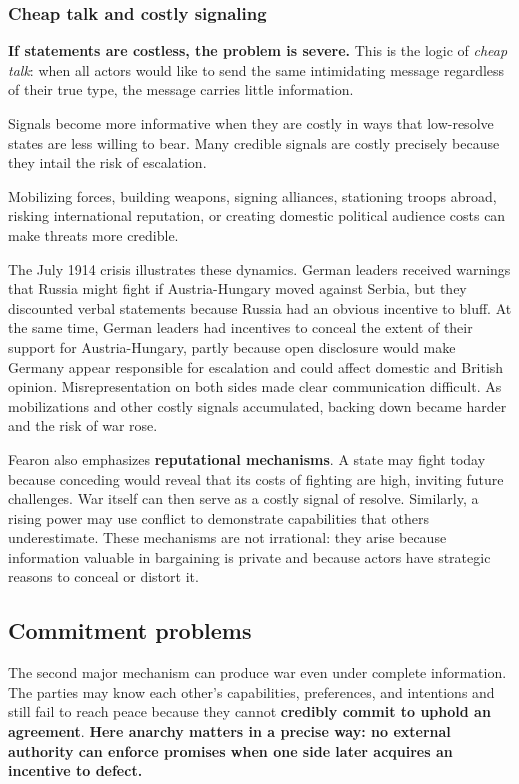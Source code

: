 \subsubsection{Cheap talk and costly signaling}

\textbf{If statements are costless, the problem is severe.} This is the logic of \textit{cheap talk}: when all actors would like to send the same intimidating message regardless of their true type, the message carries little information.

Signals become more informative when they are costly in ways that low-resolve states are less willing to bear. Many credible signals are costly precisely because they intail the risk of escalation.

Mobilizing forces, building weapons, signing alliances, stationing troops abroad, risking international reputation, or creating domestic political audience costs can make threats more credible. 

The July 1914 crisis illustrates these dynamics. German leaders received warnings that Russia might fight if Austria-Hungary moved against Serbia, but they discounted verbal statements because Russia had an obvious incentive to bluff. At the same time, German leaders had incentives to conceal the extent of their support for Austria-Hungary, partly because open disclosure would make Germany appear responsible for escalation and could affect domestic and British opinion. Misrepresentation on both sides made clear communication difficult. As mobilizations and other costly signals accumulated, backing down became harder and the risk of war rose.

Fearon also emphasizes \textbf{reputational mechanisms}. A state may fight today because conceding would reveal that its costs of fighting are high, inviting future challenges. War itself can then serve as a costly signal of resolve. Similarly, a rising power may use conflict to demonstrate capabilities that others underestimate. These mechanisms are not irrational: they arise because information valuable in bargaining is private and because actors have strategic reasons to conceal or distort it.

\subsection{Commitment problems}

The second major mechanism can produce war even under complete information. The parties may know each other's capabilities, preferences, and intentions and still fail to reach peace because they cannot \textbf{credibly commit to uphold an agreement}. \textbf{Here anarchy matters in a precise way: no external authority can enforce promises when one side later acquires an incentive to defect.}

